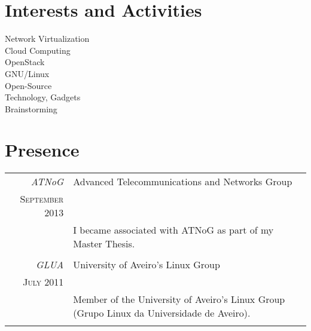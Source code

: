 \documentclass[a4paper,10pt]{article} %
\begin{document}

\section{Interests and Activities}
Network Virtualization\\
Cloud Computing\\
OpenStack\\
GNU/Linux\\
Open-Source\\
Technology, Gadgets\\
Brainstorming\\


\section{Presence}
\begin{tabular}{r|p{11cm}}
	\emph{ATNoG} & Advanced Telecommunications and Networks Group \\
	\textsc{September 2013} & \\ 
	& \footnotesize{I became associated with ATNoG as part of my Master Thesis.}\\
	\multicolumn{2}{c}{} \\
	\emph{GLUA} & University of Aveiro's Linux Group \\
	\textsc{July 2011} & \\ 
	& \footnotesize{Member of the University of Aveiro's Linux Group (Grupo Linux da Universidade de Aveiro).}\\
	\multicolumn{2}{c}{} \\
\end{tabular}


\end{document}
